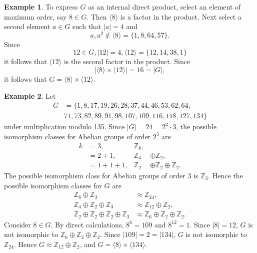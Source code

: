 \documentclass{article}
\theoremstyle{definition}
\newtheorem{example}{Example}[section]
\begin{document}
\begin{example}
        To express $G$ as an internal direct product, select an element of maximum order, say $8\in G$. Then $\langle8\rangle$ is a factor in the product. Next select a second element $a\in G$ such that $|a|=4$ and 
        \begin{equation*}
            a,a^2\notin\langle8\rangle=\{1,8,64,57\}. 
        \end{equation*}
        Since 
        \begin{equation*}
            12\in G, |12|=4, \langle 12 \rangle = \{12, 14, 38, 1\}
        \end{equation*}
        it follows that $\langle12\rangle$ is the second factor in the product. Since
        \begin{equation*}
            |\langle8\rangle\times\langle12\rangle|=16=|G|,
        \end{equation*}
        it follows that $G=\langle8\rangle\times\langle12\rangle$.
   \end{example}
   
   \begin{example}
       Let 
       \begin{align*}
           G&=\{1,8,17,19,26,28,37,44,46,53,62,64, \\
           &71,73,82,89,91,98, 107, 109, 116, 118, 127, 134\}
       \end{align*}
        under multiplication modulo 135. Since $|G|=24=2^3\cdot3$, the possible isomorphism classes for Abelian groups of order $2^3$ are
       \begin{align*}
           k&=3, &\mathbb{Z}_8, \\
           &=2+1, &\mathbb{Z}_4&\oplus\mathbb{Z}_2, \\ &=1+1+1, &\mathbb{Z}_2&\oplus\mathbb{Z}_2\oplus\mathbb{Z}_2.
       \end{align*}
       The possible isomorphism class for Abelian groups of order 3 is $\mathbb{Z}_3$. Hence the possible isomorphism classes for $G$ are
       \begin{align*}
           \mathbb{Z}_8\oplus\mathbb{Z}_3&\approx\mathbb{Z}_{24},\\
           \mathbb{Z}_4\oplus\mathbb{Z}_2\oplus\mathbb{Z}_3&\approx\mathbb{Z}_{12}\oplus\mathbb{Z}_2,\\
           \mathbb{Z}_2\oplus\mathbb{Z}_2\oplus\mathbb{Z}_2\oplus\mathbb{Z}_3&\approx\mathbb{Z}_6\oplus\mathbb{Z}_2\oplus\mathbb{Z}_2.
       \end{align*}
       Consider $8\in G$. By direct calculations, $8^6=109$ and $8^{12}=1$. Since $|8|=12$, $G$ is not isomorphic to $\mathbb{Z}_6\oplus\mathbb{Z}_2\oplus\mathbb{Z}_2$. Since $|109|=2=|134|$, $G$ is not isomorphic to $\mathbb{Z}_{24}$. Hence $G\approx\mathbb{Z}_{12}\oplus\mathbb{Z}_2$, and $G=\langle8\rangle\times\langle134\rangle$.
   \end{example}
   
\end{document}
